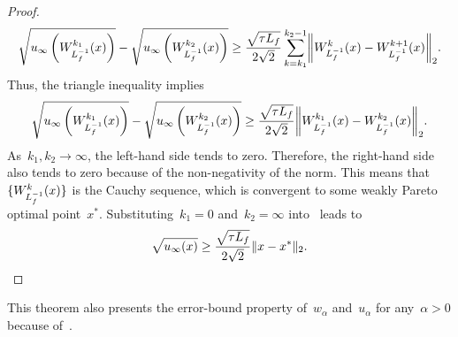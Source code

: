 \documentclass[../main]{subfiles}
\begin{document}
\begin{proof}
    \begin{equation}
        \sqrt{u_\infty\left(W_{L_f^{-1}}^{k_1}(x)\right)} - \sqrt{u_\infty\left(W_{L_f^{-1}}^{k_2}(x)\right)} \ge \frac{\sqrt{\tau L_f}}{2 \sqrt{2}} \sum_{k = k_1}^{k_2 - 1} \norm*{W_{L_f^{-1}}^k(x) - W_{L_f^{-1}}^{k + 1}(x)}_2
    .\end{equation}
    Thus, the triangle inequality implies
    \begin{equation} \label{eq:proximal_PL_MO_EB:sq_gap_Cauchy}
        \sqrt{u_\infty\left(W_{L_f^{-1}}^{k_1}(x)\right)} - \sqrt{u_\infty\left(W_{L_f^{-1}}^{k_2}(x)\right)} \ge \frac{\sqrt{\tau L_f}}{2 \sqrt{2}} \norm*{W_{L_f^{-1}}^{k_1}(x) - W_{L_f^{-1}}^{k_2}(x)}_2
    .\end{equation}
    As~$k_1, k_2 \to \infty$, the left-hand side tends to zero.
    Therefore, the right-hand side also tends to zero because of the non-negativity of the norm.
    This means that~$\lbrace W_{L_f^{-1}}^k(x)\rbrace$ is the Cauchy sequence, which is convergent to some weakly Pareto optimal point~$x^*$.
    Substituting~$k_1 = 0$ and~$k_2 = \infty$ into~ leads to
    \begin{equation}
        \sqrt{u_\infty(x)} \ge \frac{\sqrt{\tau L_f}}{2 \sqrt{2}} \lVert x - x^*\rVert_2
    .\end{equation}
\end{proof}
This theorem also presents the error-bound property of~$w_\alpha$ and~$u_\alpha$ for any~$\alpha > 0$ because of~.
\end{document}
